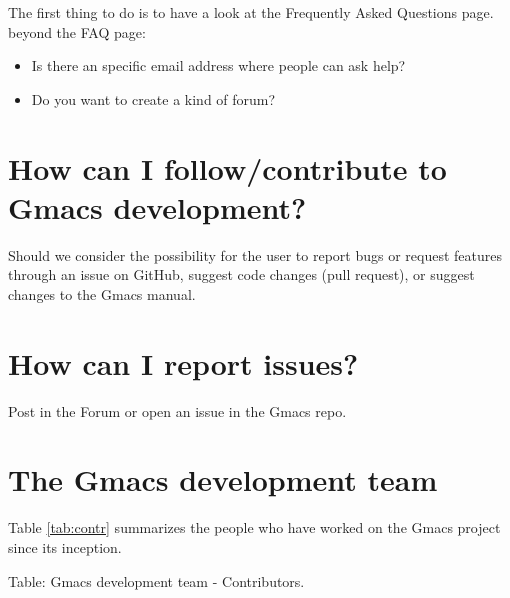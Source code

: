 \documentclass[
]{book}
\providecommand{\tightlist}{%
  \setlength{\itemsep}{0pt}\setlength{\parskip}{0pt}}
\begin{document}
The first thing to do is to have a look at the Frequently Asked Questions page.
beyond the FAQ page:

\begin{itemize}
\tightlist
\item
  Is there an specific email address where people can ask help?
\item
  Do you want to create a kind of forum?
\end{itemize}

\hypertarget{how-can-i-followcontribute-to-gmacs-development}{%
\section*{How can I follow/contribute to Gmacs development?}\label{how-can-i-followcontribute-to-gmacs-development}}

Should we consider the possibility for the user to report bugs or request features through an issue on GitHub, suggest code changes (pull request), or suggest changes to the Gmacs manual.

\hypertarget{how-can-i-report-issues}{%
\section*{How can I report issues?}\label{how-can-i-report-issues}}

Post in the Forum or open an issue in the Gmacs repo.

\hypertarget{the-gmacs-development-team}{%
\section*{The Gmacs development team}\label{the-gmacs-development-team}}

Table \ref{tab:contr} summarizes the people who have worked on the Gmacs project since its inception.

Table:\label{tab:contr} Gmacs development team - Contributors.
\end{document}
